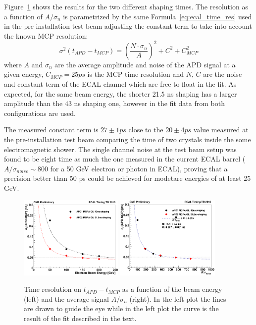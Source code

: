 Figure~\ref{fig:results_treso} shows the results for the two different shaping times.
The resolution as a function of $A/\sigma_{n}$ is parametrized by the same Formula~\ref{eq:ecal_time_res} used in the
pre-installation test beam adjusting the constant term to take into account the known MCP resolution:
\[
  \sigma^2(t_{APD} - t_{MCP}) = \left( \frac{N\cdot\sigma_n}{A} \right)^2 + C^2 + C_{MCP}^2
\]
where $A$ and $\sigma_n$ are the average amplitude and noise of the APD signal at a given energy, $C_{MCP} = 25 ps$ is
the MCP time resolution and $N$, $C$ are the noise and constant term of the ECAL channel which are free to float in the fit.
As expected, for the same beam energy, the shorter 21.5 ns shaping has a larger amplitude than the 43 ns shaping one,
however in the fit data from both configurations are used.

The measured constant term is $27 \pm 1 ps$ close to the $20 \pm 4 ps$ value measured at the pre-installation test beam comparing the
time of two crystals inside the some electromagnetic shower.
The single channel noise at the test beam setup was found to be eight time as much the one measured in the current ECAL barrel
($A/\sigma_{noise} \sim 800$ for a 50 GeV electron or photon in ECAL), proving that a precision better than 50 ps could
be achieved for modetare energies of at least 25 GeV.

\begin{figure}[h!]
  \centering
  \includegraphics[width = 0.45\textwidth]{figures/upgrade/APD_t_res_vs_energy.png}
  \includegraphics[width = 0.45\textwidth]{figures/upgrade/APD_t_res_vs_AoverN.png}
  \caption{Time resolution on $t_{APD}-t_{MCP}$ as a function of the beam energy (left)
    and the average signal $A/\sigma_n$ (right).
    In the left plot the lines are drawn to guide the eye while in the left plot the curve is the result of the
    fit described in the text.}
  \label{fig:results_treso}
\end{figure}